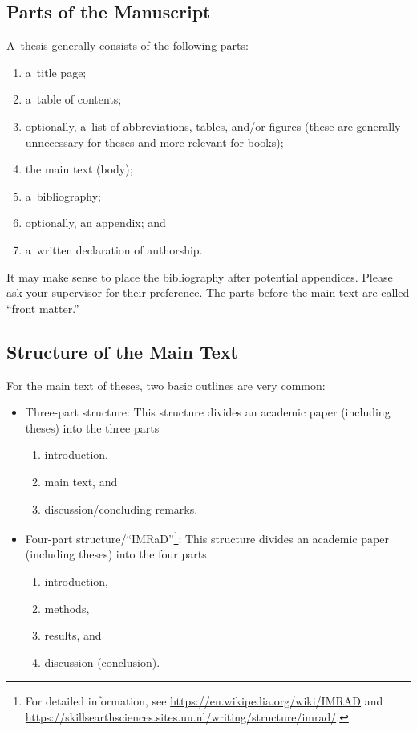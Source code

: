 \documentclass[11pt, a4paper, oneside]{article}
\theoremstyle{Plain}
\theoremstyle{Definition}
\theoremstyle{Remark}
\begin{document}
\subsection{Parts of the Manuscript}

A~thesis generally consists of the following parts:
\begin{enumerate}
	\item a~title page;
	\item a~table of contents;
	\item optionally, a~list of abbreviations, tables, and/or figures (these are generally unnecessary for theses and more relevant for books);
	\item the main text (body);
	\item a~bibliography;
	\item optionally, an appendix; and
	\item a~written declaration of authorship.
\end{enumerate}
It may make sense to place the bibliography after potential appendices. Please ask your supervisor for their preference. The parts before the main text are called ``front matter.''

\subsection{Structure of the Main Text}

For the main text of theses, two basic outlines are very common:
\begin{itemize}
	\item Three-part structure: This structure divides an academic paper (including theses) into the three parts
		\begin{enumerate}
			\item introduction,
			\item main text, and
			\item discussion/concluding remarks.
		\end{enumerate}
	\item Four-part structure/``IMRaD''\footnote{For detailed information, see \url{https://en.wikipedia.org/wiki/IMRAD} and \url{https://skillsearthsciences.sites.uu.nl/writing/structure/imrad/}.}: This structure divides an academic paper (including theses) into the four parts
		\begin{enumerate}
			\item introduction,
			\item methods,
			\item results, and
			\item discussion (conclusion).
		\end{enumerate}
\end{itemize}
\end{document}
